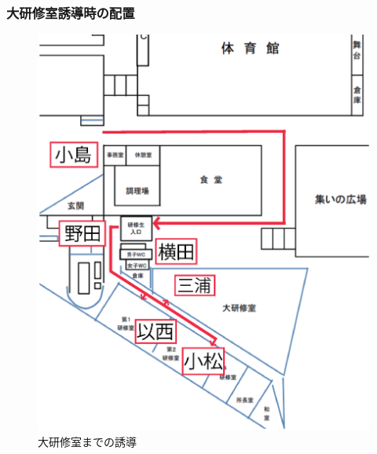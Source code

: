 \newpage
\newpage
\subsubsection{大研修室誘導時の配置}
\begin{figure}[htbp]
  \begin{center}
   \includegraphics[scale=0.4]{./03/yuudou.eps}
  \end{center}
  \caption{大研修室までの誘導}
  \label{fig:hare}
\end{figure}


